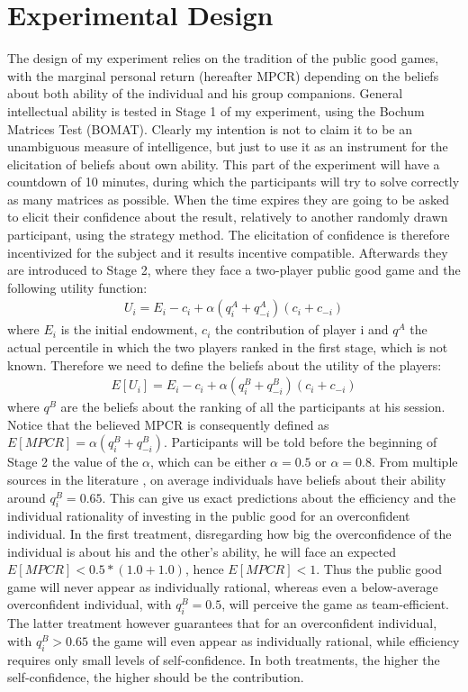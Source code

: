 \documentclass[11pt,twoside,a4paper,leqno]{article}
\begin{document}
\section*{Experimental Design}
The design of my experiment relies on the tradition of the public good games, with the marginal personal return (hereafter MPCR) depending on the beliefs about both ability of the individual and his group companions. General intellectual ability is tested in Stage 1 of my experiment, using the Bochum Matrices Test (BOMAT)\textsuperscript{\cite{BOMAT}}. Clearly my intention is not to claim it to be an unambiguous measure of intelligence, but just to use it as an instrument for the elicitation of beliefs about own ability. This part of the experiment will have a countdown of 10 minutes, during which the participants will try to solve correctly as many matrices as possible. When the time expires they are going to be asked to elicit their confidence about the result, relatively to another randomly drawn participant, using the strategy method.\textsuperscript{\cite{Blav}}\textsuperscript{\cite{Goette}} The elicitation of confidence is therefore incentivized for the subject and it results incentive compatible. Afterwards they are introduced to Stage 2, where they face a two-player public good game and the following utility function:
\begin{align}
	U_{i} = E_{i} - c_{i} + \alpha(q_{i}^A + q_{-i}^A)(c_{i} + c_{-i})
\end{align}
where $E_{i}$ is the initial endowment, $c_{i}$ the contribution of player i and $q^A$ the actual percentile in which the two players ranked in the first stage, which is not known. Therefore we need to define the beliefs about the utility of the players:
\begin{align}
	E[U_{i}] = E_{i} - c_{i} + \alpha(q_{i}^B + q_{-i}^B)(c_{i} + c_{-i})
\end{align}
where $q^B$ are the beliefs about the ranking of all the participants at his session. Notice that the believed MPCR is consequently defined as $E[MPCR] = \alpha(q_{i}^B + q_{-i}^B)$. Participants will be told before the beginning of Stage 2 the value of the $\alpha$, which can be either $\alpha = 0.5$ or $\alpha= 0.8$. From multiple sources in the literature \textsuperscript{\cite{KD}}\textsuperscript{\cite{Burks}}\textsuperscript{\cite{Healy}}, on average individuals have beliefs about their ability around $q_{i}^B = 0.65$. This can give us exact predictions about the efficiency and the individual rationality of investing in the public good for an overconfident individual. In the first treatment, disregarding how big the overconfidence of the individual is about his and the other's ability, he will face an expected $E[MPCR] < 0.5*(1.0 + 1.0)$, hence $E[MPCR] < 1$. Thus the public good game will never appear as individually rational, whereas even a below-average overconfident individual, with $q_{i}^B = 0.5$, will perceive the game as team-efficient. The latter treatment however guarantees that for an overconfident individual, with $q_{i}^B > 0.65$ the game will even appear as individually rational, while efficiency requires only small levels of self-confidence. In both treatments, the higher the self-confidence, the higher should be the contribution.
\end{document}
